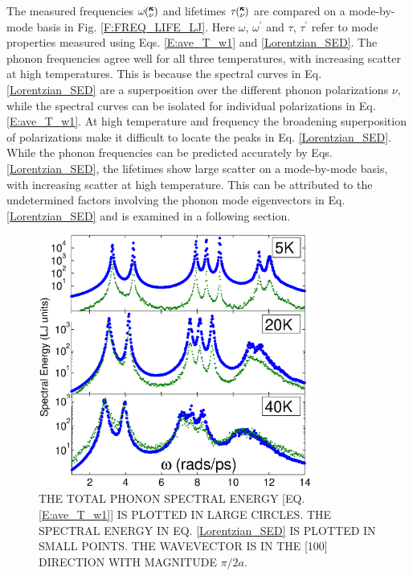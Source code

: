 \documentclass[twocolumn,10pt]{asme2e}
\newcommand{\kv}{\mspace{-4.0mu}\left(\mspace{-8.0mu}\begin{smallmatrix}&\pmb{\kappa} \\&\nu\end{smallmatrix}\mspace{-3.0mu}\right)}
\begin{document}
The measured frequencies $\omega\kv$ and lifetimes $\tau\kv$ are compared on a mode-by-mode basis in Fig$.$ \ref{F:FREQ_LIFE_LJ}. Here $\omega$, $\omega^{'}$ and $\tau$, $\tau^{'}$  refer to mode properties measured using Eqs$.$ \eqref{E:ave_T_w1} and \eqref{Lorentzian_SED}. The phonon frequencies agree well for all three temperatures, with increasing scatter at high temperatures.  This is because the spectral curves in Eq$.$ \eqref{Lorentzian_SED} are a superposition over the different phonon polarizations $\nu$, while the spectral curves can be isolated for individual polarizations in Eq$.$ \eqref{E:ave_T_w1}. At high temperature and frequency the broadening superposition of polarizations make it difficult to locate the peaks in Eq$.$ \eqref{Lorentzian_SED}. While the phonon frequencies can be predicted accurately by Eqs$.$ \eqref{Lorentzian_SED}, the lifetimes show large scatter on a mode-by-mode basis, with increasing scatter at high temperature.  This can be attributed to the undetermined factors involving the phonon mode eigenvectors in Eq$.$ \eqref{Lorentzian_SED} and is examined in a following section.

\begin{figure}
\begin{center}
\includegraphics[angle=0,width=90.0mm]{LJ_NMD_SED_PEAK_COMPARE.eps}
\end{center}
\caption{\label{F:PEAK_COMPARE} THE TOTAL PHONON SPECTRAL ENERGY [EQ$.$ \eqref{E:ave_T_w1}] IS PLOTTED IN LARGE CIRCLES.  THE SPECTRAL ENERGY IN EQ$.$ \eqref{Lorentzian_SED} IS PLOTTED IN SMALL POINTS. THE WAVEVECTOR IS IN THE [100] DIRECTION WITH MAGNITUDE $\pi/2a$.}
\vspace*{-5mm}
\end{figure}
\end{document}
